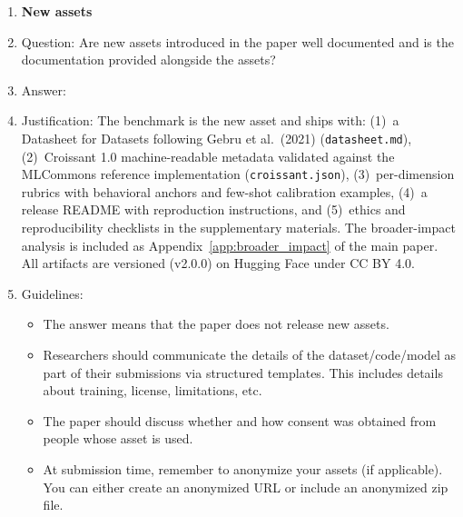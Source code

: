 \begin{enumerate}
\item {\bf New assets}
    \item[] Question: Are new assets introduced in the paper well documented and is the documentation provided alongside the assets?
    \item[] Answer: \answerYes{}
    \item[] Justification: The benchmark is the new asset and ships with: (1)~a Datasheet for Datasets following Gebru et al.\ (2021) (\texttt{datasheet.md}), (2)~Croissant 1.0 machine-readable metadata validated against the MLCommons reference implementation (\texttt{croissant.json}), (3)~per-dimension rubrics with behavioral anchors and few-shot calibration examples, (4)~a release README with reproduction instructions, and (5)~ethics and reproducibility checklists in the supplementary materials. The broader-impact analysis is included as Appendix~\ref{app:broader_impact} of the main paper. All artifacts are versioned (v2.0.0) on Hugging Face under CC BY 4.0.
    \item[] Guidelines:
    \begin{itemize}
        \item The answer \answerNA{} means that the paper does not release new assets.
        \item Researchers should communicate the details of the dataset\slash code\slash model as part of their submissions via structured templates. This includes details about training, license, limitations, etc.
        \item The paper should discuss whether and how consent was obtained from people whose asset is used.
        \item At submission time, remember to anonymize your assets (if applicable). You can either create an anonymized URL or include an anonymized zip file.
    \end{itemize}


\end{enumerate}
